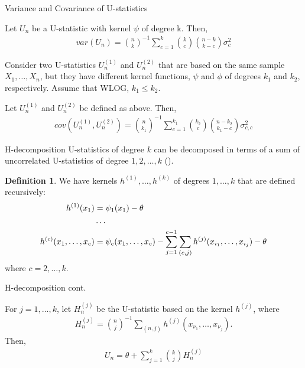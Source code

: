 \documentclass{beamer}
\theoremstyle{definition}
\newtheorem{Def}{Definition}
\numberwithin{Def}{section}
\begin{document}
\begin{frame}{Variance and Covariance of U-statistics}
\begin{theorem}\label{var_u_stat}
Let $U_n$ be a U-statistic with kernel $\psi$ of degree k. Then, 
\begin{align}
    var(U_n) = {n \choose k}^{-1}\sum_{c=1}^k{k \choose c}{n-k \choose k-c} \sigma_c^2
\end{align}
\end{theorem} 
\pause 
Consider two U-statistics $U_n^{(1)}$ and $U_n^{(2)}$ that are based on the same sample $X_1, \dotsc, X_n$, but they have different kernel functions, $\psi$ and $\phi$ of degrees $k_1$ and $k_2$, respectively. Assume that WLOG, $k_1 \leq k_2$. 
    \begin{theorem}
    Let $U_n^{(1)}$ and $U_n^{(2)}$ be defined as above. Then, 
    \begin{align}
        cov(U_n^{(1)}, U_n^{(2)}) = {n \choose k_1}^{-1}\sum_{c=1}^{k_1}{k_2 \choose c}{n-k_2 \choose k_1 - c}\sigma_{c,c}^2
        \end{align}
    \end{theorem}  

\end{frame}

\begin{frame}{H-decomposition}
U-statistics of degree $k$ can be decomposed in terms of a sum of uncorrelated U-statistics of degree $1, 2, \dotsc, k$  (\cite{hoeffding1961strong}). 

\begin{Def}
We have kernels $h^{(1)}, \dotsc, h^{(k)}$ of degrees $1, \dotsc, k$ that are defined recursively:
\begin{align}
    h^{(1)}(x_1) &= \psi_1(x_1) - \theta \notag \\
    &\dotsc \notag \\
    h^{(c)}(x_1, \dotsc, x_c) &= \psi_c(x_1, \dotsc, x_c) - \sum_{j=1}^{c-1}\sum_{(c,j)}h^{(j)}(x_{i_1}, \dotsc, x_{i_j}) - \theta \label{h_recursive}
\end{align}
where $c = 2, \dotsc, k$. 
\end{Def}
\end{frame}

\begin{frame}{H-decomposition cont. }
 \begin{theorem}
For $j = 1, \dotsc, k$, let $H_n^{(j)}$ be the U-statistic based on the kernel $h^{(j)}$, where \begin{align}
H_n^{(j)} = {n \choose j}^{-1} \sum_{(n,j)}h^{(j)}(x_{\nu_1}, \dotsc, x_{\nu_j}). 
\end{align}
Then,
\begin{align}
    U_n  = \theta + \sum_{j=1}^k{k \choose j}H_n^{(j)}
\end{align}
\end{theorem}   
\end{frame}
\end{document}
